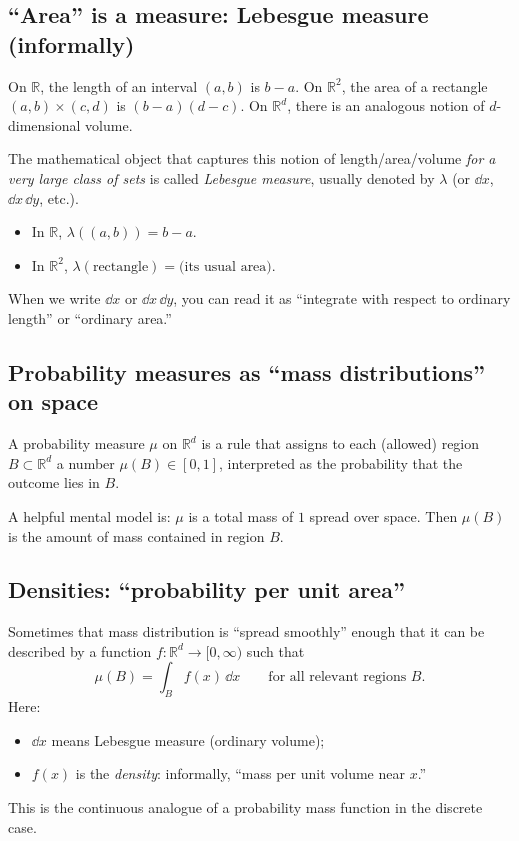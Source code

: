 \documentclass[11pt]{article}
\theoremstyle{remark}
\begin{document}
\subsection{``Area'' is a measure: Lebesgue measure (informally)}
On \(\mathbb{R}\), the length of an interval \((a,b)\) is \(b-a\).
On \(\mathbb{R}^2\), the area of a rectangle \((a,b)\times(c,d)\) is \((b-a)(d-c)\).
On \(\mathbb{R}^d\), there is an analogous notion of \(d\)-dimensional volume.

The mathematical object that captures this notion of length/area/volume \emph{for a very large
class of sets} is called \emph{Lebesgue measure}, usually denoted by \(\lambda\) (or \(\dd x\), \(\dd x\,\dd y\), etc.).
\begin{itemize}
\item In \(\mathbb{R}\), \(\lambda((a,b))=b-a\).
\item In \(\mathbb{R}^2\), \(\lambda(\text{rectangle})=\text{(its usual area)}\).
\end{itemize}
When we write \(\dd x\) or \(\dd x\,\dd y\), you can read it as ``integrate with respect to ordinary length''
or ``ordinary area.''

\subsection{Probability measures as ``mass distributions'' on space}
A probability measure \(\mu\) on \(\mathbb{R}^d\) is a rule that assigns to each (allowed) region
\(B\subset\mathbb{R}^d\) a number \(\mu(B)\in[0,1]\), interpreted as the probability that the outcome
lies in \(B\).

A helpful mental model is: \(\mu\) is a total mass of \(1\) spread over space.
Then \(\mu(B)\) is the amount of mass contained in region \(B\).

\subsection{Densities: ``probability per unit area''}
Sometimes that mass distribution is ``spread smoothly'' enough that it can be described by a function
\(f:\mathbb{R}^d\to[0,\infty)\) such that
\[
\mu(B)=\int_B f(x)\,\dd x
\qquad\text{for all relevant regions } B.
\]
Here:
\begin{itemize}
\item \(\dd x\) means Lebesgue measure (ordinary volume);
\item \(f(x)\) is the \emph{density}: informally, ``mass per unit volume near \(x\).'' 
\end{itemize}
This is the continuous analogue of a probability mass function in the discrete case.
\end{document}
